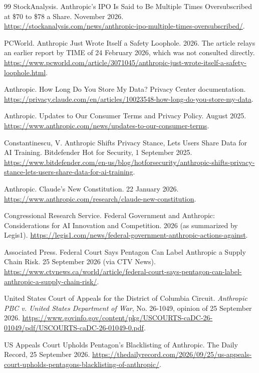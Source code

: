 \documentclass[12pt]{article}
\theoremstyle{definition}
\theoremstyle{remark}
\begin{document}
\begin{thebibliography}{99}
StockAnalysis. Anthropic's IPO Is Said to Be Multiple Times Oversubscribed at \$70 to \$78 a Share. November 2026. \url{https://stockanalysis.com/news/anthropic-ipo-multiple-times-oversubscribed/}.

PCWorld. Anthropic Just Wrote Itself a Safety Loophole. 2026. The article relays an earlier report by TIME of 24 February 2026, which was not consulted directly. \url{https://www.pcworld.com/article/3071045/anthropic-just-wrote-itself-a-safety-loophole.html}.


Anthropic. How Long Do You Store My Data? Privacy Center documentation. \url{https://privacy.claude.com/en/articles/10023548-how-long-do-you-store-my-data}.

Anthropic. Updates to Our Consumer Terms and Privacy Policy. August 2025. \url{https://www.anthropic.com/news/updates-to-our-consumer-terms}.

Constantinescu, V. Anthropic Shifts Privacy Stance, Lets Users Share Data for AI Training. Bitdefender Hot for Security, 1 September 2025. \url{https://www.bitdefender.com/en-us/blog/hotforsecurity/anthropic-shifts-privacy-stance-lets-users-share-data-for-ai-training}.

Anthropic. Claude's New Constitution. 22 January 2026. \url{https://www.anthropic.com/research/claude-new-constitution}.

Congressional Research Service. Federal Government and Anthropic: Considerations for AI Innovation and Competition. 2026 (as summarized by Legis1). \url{https://legis1.com/news/federal-government-anthropic-actions-against}.

Associated Press. Federal Court Says Pentagon Can Label Anthropic a Supply Chain Risk. 25 September 2026 (via CTV News). \url{https://www.ctvnews.ca/world/article/federal-court-says-pentagon-can-label-anthropic-a-supply-chain-risk/}.

United States Court of Appeals for the District of Columbia Circuit. \textit{Anthropic PBC v. United States Department of War}, No. 26-1049, opinion of 25 September 2026. \url{https://www.govinfo.gov/content/pkg/USCOURTS-caDC-26-01049/pdf/USCOURTS-caDC-26-01049-0.pdf}.

US Appeals Court Upholds Pentagon's Blacklisting of Anthropic. The Daily Record, 25 September 2026. \url{https://thedailyrecord.com/2026/09/25/us-appeals-court-upholds-pentagons-blacklisting-of-anthropic/}.


\end{thebibliography}
\end{document}
